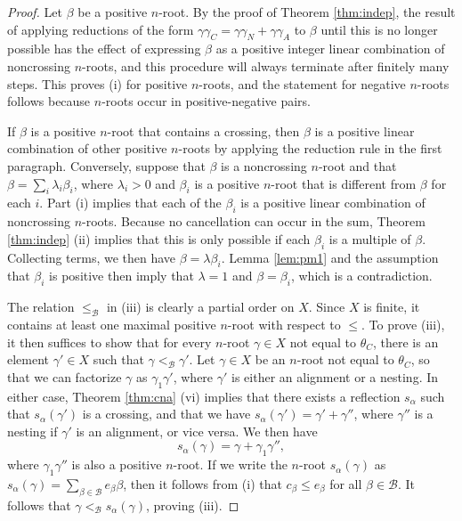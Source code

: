 \documentclass[11pt]{amsart}
\theoremstyle{plain}
\theoremstyle{definition}
\theoremstyle{remark}
\numberwithin{equation}{subsection}
\newcommand{\al}{\alpha}
\newcommand{\be}{\beta}
\newcommand{\Be}{\mathcal B}
\begin{document}
\begin{proof}
Let $\be$ be a positive $n$-root. By the proof of Theorem \ref{thm:indep}, the
result of applying reductions of the form $\gamma \gamma_C = \gamma \gamma_N +
\gamma \gamma_A$ to $\be$ until this is no longer possible has the effect of
expressing $\be$ as a positive integer linear combination of noncrossing
$n$-roots, and this procedure will always terminate after finitely many steps.
This proves (i) for positive $n$-roots, and the statement for negative $n$-roots
follows because $n$-roots occur in positive-negative pairs.

If $\be$ is a positive $n$-root that contains a crossing, then $\be$ is a
positive linear combination of other positive $n$-roots by applying the
reduction rule in the first paragraph. Conversely, suppose that $\be$ is a
noncrossing $n$-root and that $\be = \sum_i \lambda_i \be_i$, where $\lambda_i >
0$ and $\be_i$ is a positive $n$-root that is different from $\be$  for each
$i$. Part (i) implies that each of the $\be_i$ is a positive linear combination
of noncrossing $n$-roots. Because no cancellation can occur in the sum, Theorem
\ref{thm:indep} (ii) implies that this is only possible if each $\be_i$ is a
multiple of $\be$.  Collecting terms, we then have $\be = \lambda \be_i$. Lemma
\ref{lem:pm1} and the assumption that $\be_i$ is positive then imply that
$\lambda=1$ and $\be = \be_i$, which is a contradiction.

The relation $\le_\Be$ in (iii) is clearly a partial order on $X$.  Since $X$ is
finite, it contains at least one maximal positive $n$-root with respect to
$\le$. To prove (iii), it then suffices to show that for every  $n$-root
$\gamma\in X$ not equal to $\theta_C$, there is an element $\gamma'\in X$ such
that $\gamma<_\Be\gamma'$.  Let $\gamma\in X$ be an $n$-root not equal to
$\theta_C$, so that we can factorize $\gamma$ as $\gamma_1 \gamma'$, where
$\gamma'$ is either an alignment or a nesting. In either case, Theorem
\ref{thm:cna} (vi) implies that there exists a reflection $s_\al$ such that
$s_\al(\gamma')$ is a crossing, and that we have $s_\al(\gamma') = \gamma' +
\gamma''$, where $\gamma''$ is a nesting if $\gamma'$ is an alignment, or vice
versa. We then have $$ s_\al(\gamma) = \gamma + \gamma_1\gamma'' ,$$ where
$\gamma_1\gamma''$ is also a positive $n$-root. If we write  the $n$-root
$s_\al(\gamma)$ as $s_\al(\gamma) = \sum_{\be \in \Be} e_\be \be$, then it
follows from (i) that $c_\be \leq e_\be$ for all $\be \in \Be$. It follows that
$\gamma<_\Be s_\al(\gamma)$, proving (iii).


\end{proof}
\end{document}
